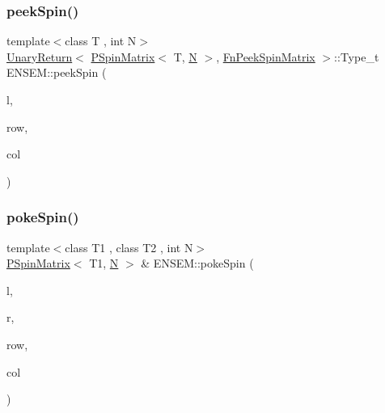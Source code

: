 \subsubsection{\texorpdfstring{peekSpin()}{peekSpin()}}
{\footnotesize\ttfamily template$<$class T , int N$>$ \\
\mbox{\hyperlink{structENSEM_1_1UnaryReturn}{Unary\+Return}}$<$ \mbox{\hyperlink{classENSEM_1_1PSpinMatrix}{P\+Spin\+Matrix}}$<$ T, \mbox{\hyperlink{operator__name__util_8cc_a7722c8ecbb62d99aee7ce68b1752f337}{N}} $>$, \mbox{\hyperlink{structENSEM_1_1FnPeekSpinMatrix}{Fn\+Peek\+Spin\+Matrix}} $>$\+::Type\+\_\+t E\+N\+S\+E\+M\+::peek\+Spin (\begin{DoxyParamCaption}\item[{const \mbox{\hyperlink{classENSEM_1_1PSpinMatrix}{P\+Spin\+Matrix}}$<$ T, \mbox{\hyperlink{operator__name__util_8cc_a7722c8ecbb62d99aee7ce68b1752f337}{N}} $>$ \&}]{l,  }\item[{int}]{row,  }\item[{int}]{col }\end{DoxyParamCaption})\hspace{0.3cm}{\ttfamily [inline]}}

\mbox{\label{group__primspinmatrix_ga79a215ef6e9982decb24addd77e93dae}} 
\subsubsection{\texorpdfstring{pokeSpin()}{pokeSpin()}}
{\footnotesize\ttfamily template$<$class T1 , class T2 , int N$>$ \\
\mbox{\hyperlink{classENSEM_1_1PSpinMatrix}{P\+Spin\+Matrix}}$<$ T1, \mbox{\hyperlink{operator__name__util_8cc_a7722c8ecbb62d99aee7ce68b1752f337}{N}} $>$ \& E\+N\+S\+E\+M\+::poke\+Spin (\begin{DoxyParamCaption}\item[{\mbox{\hyperlink{classENSEM_1_1PSpinMatrix}{P\+Spin\+Matrix}}$<$ T1, \mbox{\hyperlink{operator__name__util_8cc_a7722c8ecbb62d99aee7ce68b1752f337}{N}} $>$ \&}]{l,  }\item[{const \mbox{\hyperlink{classENSEM_1_1PScalar}{P\+Scalar}}$<$ T2 $>$ \&}]{r,  }\item[{int}]{row,  }\item[{int}]{col }\end{DoxyParamCaption})\hspace{0.3cm}{\ttfamily [inline]}}



